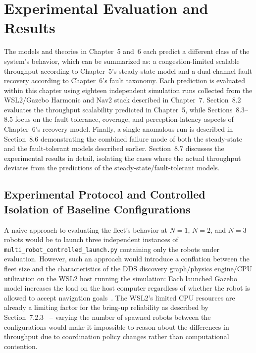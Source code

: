 \chapter{Experimental Evaluation and Results\label{cha:chapter8}}

The models and theories in Chapter~5 and~6 each predict a different class of the system's behavior, which can be summarized as: a congestion-limited scalable throughput according to Chapter~5's steady-state model and a dual-channel fault recovery according to Chapter~6's fault taxonomy. Each prediction is evaluated within this chapter using eighteen independent simulation runs collected from the WSL2/Gazebo Harmonic and Nav2 stack described in Chapter~7. Section~8.2 evaluates the throughput scalability predicted in Chapter~5, while Sections~8.3--8.5 focus on the fault tolerance, coverage, and perception-latency aspects of Chapter~6's recovery model. Finally, a single anomalous run is described in Section~8.6 demonstrating the combined failure mode of both the steady-state and the fault-tolerant models described earlier. Section~8.7 discusses the experimental results in detail, isolating the cases where the actual throughput deviates from the predictions of the steady-state/fault-tolerant models.

\section{Experimental Protocol and Controlled Isolation of Baseline Configurations}

A naive approach to evaluating the fleet's behavior at $N=1$, $N=2$, and $N=3$ robots would be to launch three independent instances of \texttt{multi\_robot\_controlled\_launch.py} containing only the robots under evaluation. However, such an approach would introduce a conflation between the fleet size and the characteristics of the DDS discovery graph/physics engine/CPU utilization on the WSL2 host running the simulation: Each launched Gazebo model increases the load on the host computer regardless of whether the robot is allowed to accept navigation goals~\cite{kronauer2021latency}. The WSL2's limited CPU resources are already a limiting factor for the bring-up reliability as described by Section~7.2.3~\cite{paul2024performance} -- varying the number of spawned robots between the configurations would make it impossible to reason about the differences in throughput due to coordination policy changes rather than computational contention.

